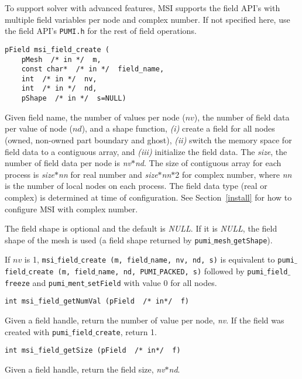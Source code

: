 To support solver with advanced features, MSI supports the field API's with multiple field variables per node and complex number. If not specified here, use the field API's \texttt{PUMI.h} for the rest of field operations.

\begin{verbatim}
pField msi_field_create (
    pMesh  /* in */  m,
    const char*  /* in */  field_name, 
    int  /* in */  nv, 
    int  /* in */  nd, 
    pShape  /* in */  s=NULL)
\end{verbatim}\vspace{-.5cm}\hspace{1cm}
Given field name, the number of values per node ($nv$), the number of field data per value of node ($nd$), and a shape function, \emph{(i)} create a field for all nodes (owned, non-owned part boundary and ghost), \emph{(ii)} switch the memory space for field data to a contiguous array, and \emph{(iii)} initialize the field data. The \emph{size}, the number of field data per node is \textit{nv}$*$\textit{nd}. The size of contiguous array for each process is \textit{size}$*$\textit{nn} for real number and \textit{size}$*$\textit{nn}$*$2 for complex number, where \textit{nn} is the number of local nodes on each process. The field data type (real or complex) is determined at time of configuration. See Section~\ref{install} for how to configure MSI with complex number.

The field shape is optional and the default is \textit{NULL}. If it is \textit{NULL}, the field shape of the mesh is used (a field shape returned by \texttt{pumi$\_$mesh$\_$getShape}).

 If $nv$ is 1, \texttt{msi$\_$field$\_$create (m, field$\_$name, nv, nd, s)} is equivalent to \texttt{pumi$\_$field$\_$create (m, field$\_$name, nd, PUMI$\_$PACKED, s)} followed by \texttt{pumi$\_$field$\_$freeze} and \texttt{pumi$\_$ment$\_$setField} with value $0$ for all nodes.

\begin{verbatim}
int msi_field_getNumVal (pField  /* in*/  f)
\end{verbatim}\vspace{-.5cm}\hspace{1cm}
Given a field handle, return the number of value per node, \textit{nv}. If the field was created with \texttt{pumi$\_$field$\_$create}, return 1.

\begin{verbatim}
int msi_field_getSize (pField  /* in*/  f)
\end{verbatim}\vspace{-.5cm}\hspace{1cm}
Given a field handle, return the field size, \textit{nv}$*$\textit{nd}.




